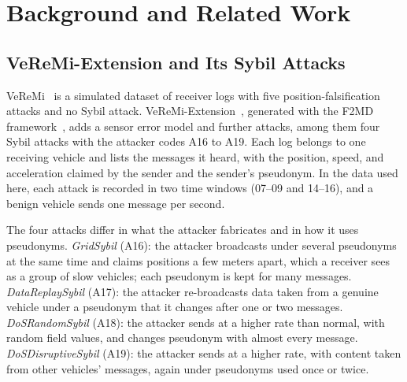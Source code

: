 \section{Background and Related Work}
\label{sec:background}

\subsection{VeReMi-Extension and Its Sybil Attacks}

VeReMi~\cite{heijden2018veremi} is a simulated dataset of receiver logs with five position-falsification attacks
and no Sybil attack. VeReMi-Extension~\cite{kamel2020veremi}, generated with the F2MD
framework~\cite{kamel2020simulation}, adds a sensor error model and further attacks, among them four Sybil attacks
with the attacker codes A16 to A19. Each log belongs to one receiving vehicle and lists the messages it heard, with the
position, speed, and acceleration claimed by the sender and the sender's pseudonym. In the data used here, each
attack is recorded in two time windows (07--09 and 14--16), and a benign vehicle sends one message per second.

The four attacks differ in what the attacker fabricates and in how it uses pseudonyms.
\emph{GridSybil} (A16): the attacker broadcasts under several pseudonyms at the same time and claims positions a
few meters apart, which a receiver sees as a group of slow vehicles; each pseudonym is kept for many messages.
\emph{DataReplaySybil} (A17): the attacker re-broadcasts data taken from a genuine vehicle under a pseudonym that
it changes after one or two messages. \emph{DoSRandomSybil} (A18): the attacker sends at a higher rate than
normal, with random field values, and changes pseudonym with almost every message. \emph{DoSDisruptiveSybil}
(A19): the attacker sends at a higher rate, with content taken from other vehicles' messages, again under
pseudonyms used once or twice.

